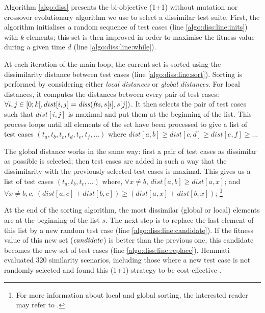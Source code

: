 Algorithm \ref{algo:diss} presents the bi-objective (1+1) without mutation nor crossover evolutionary algorithm we use to select a dissimilar test suite. First, the algorithm initialises a random sequence of test cases (line \ref{algo:diss:line:inits}) with $k$ elements; this set is then improved in order to maximise the fitness value during a given time $d$ (line \ref{algo:diss:line:while}).
 
At each iteration of the main loop, the current set is sorted using the dissimilarity distance between test cases (line \ref{algo:diss:line:sort}). Sorting is performed by considering either \emph{local distances} or \emph{global distances}. For local distances, it computes the distances between every pair of test cases: $\forall i, j \in [0;k[, dist[i,j] = \mathit{diss}(\mathit{fts}, s[i], s[j])$. It then selects the pair of test cases such that $dist[i,j]$ is maximal and put them at the beginning of the list. This process loops until all elements of the set have been processed to give a list of test cases $(t_a, t_b, t_c, t_d, t_e, t_f, \ldots)$ where $dist[a,b] \geq dist[c,d] \geq dist[e,f] \geq \ldots$

The global distance works in the same way: first a pair of test cases as dissimilar as possible is selected; then test cases are added in such a way that the dissimilarity with the previously selected test cases is maximal. This gives us a list of test cases $(t_a, t_b, t_c, \ldots)$ where, $\forall x \neq b$, $dist[a,b] \geq dist[a,x]$; and $\forall x \neq b, c$, 
$\left( dist[a,c] + dist[b,c] \right) \geq \left( dist[a,x] + dist[b,x] \right)$; \etc \footnote{For more information about local and global sorting, the interested reader may refer to \cite{Henard2014a}.}

At the end of the sorting algorithm, the most dissimilar (global or local) elements are at the beginning of the list $s$. The next step is to replace the last element of this list by a new random test case (line \ref{algo:diss:line:candidate}). If the fitness value of this new set ($\mathit{candidate}$) is better than the previous one, this candidate becomes the new set of test cases (line \ref{algo:diss:line:replace}). Hemmati \etal evaluated 320 similarity scenarios, including those where a new test case is not randomly selected and found this (1+1) strategy to be cost-effective \cite{Hemmati2013}. %


